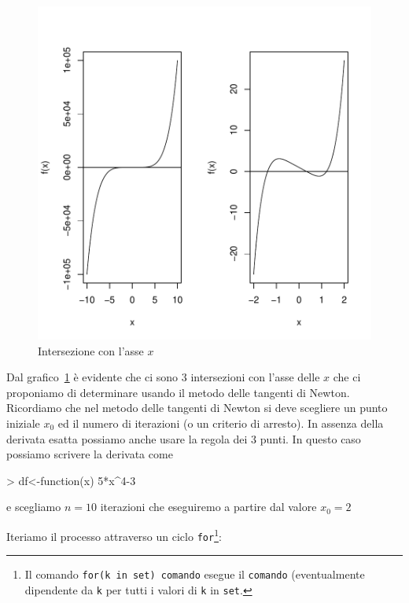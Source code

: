 \documentclass[onecolumn,11pt]{book}
\begin{document}
\begin{figure}[htbp]
\begin{center}
\includegraphics{RbookParte1-143}
\caption{Intersezione con l'asse $x$ }
\label{fig:tnewton}
\end{center}
\end{figure}
Dal grafico~\ref{fig:tnewton} \`e evidente che ci sono 3 intersezioni con l'asse delle $x$ che ci proponiamo di determinare usando il metodo delle tangenti di Newton. Ricordiamo che nel metodo delle tangenti di Newton si deve scegliere un punto iniziale $x_0$  ed il numero di iterazioni (o un criterio di arresto).
In assenza della derivata esatta possiamo anche usare la regola dei 3 punti. In questo caso possiamo scrivere la derivata come
\begin{Schunk}
\begin{Sinput}
> df<-function(x) 5*x^4-3
\end{Sinput}
\end{Schunk}
e scegliamo $n=10$ iterazioni che eseguiremo  a partire dal valore $x_0=2$

Iteriamo il processo attraverso un ciclo \texttt{for}\footnote{Il comando   \texttt{for(k in set) comando} esegue il \texttt{comando} (eventualmente dipendente da \texttt{k} per tutti i valori di \texttt{k} in \texttt{set}. }:
\end{document}
